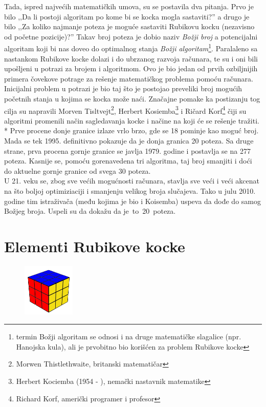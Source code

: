 \documentclass[a4paper]{article}
\begin{document}
Tada, ispred najvećih matematičkih umova, su se postavila dva pitanja. Prvo je bilo ,,Da li postoji algoritam po kome bi se kocka mogla sastaviti?'' a drugo je bilo ,,Za koliko najmanje poteza je moguće sastaviti Rubikovu kocku (nezavisno od početne pozicije)?'' Takav broj poteza je dobio naziv \textit{Božji broj} a potencijalni algoritam koji bi nas doveo do optimalnog stanja \textit{Božji algoritam}\footnote{termin Božji algoritam se odnosi i na druge matematičke slagalice (npr. Hanojska kula), ali je prvobitno bio korišćen za problem Rubikove kocke}. Paralaleno sa nastankom Rubikove kocke dolazi i do ubrzanog razvoja računara, te su i oni bili upošljeni u potrazi za brojem i algoritmom. Ovo je bio jedan od prvih ozbiljnijih primera čovekove potrage za rešenje matematičkog problema pomoću računara. \\

Inicijalni problem u potrazi je bio taj što je postojao preveliki broj mogućih početnih stanja u kojima se kocka može naći. Značajne pomake ka postizanju tog cilja su napravili Morven Tisltvejt\footnote{{Morwen Thistlethwaite}, britanski matematičar}, Herbert Kosiemba\footnote{{Herbert Kociemba} (1954 - ), nemački nastavnik matematike} i Ričard Korf\footnote{{Richard Korf}, američki programer i profesor} čiji su algoritmi promenili način sagledavanja kocke i načine na koji će se rešenje tražiti.\\*
Prve procene donje granice izlaze vrlo brzo, gde se 18 pominje kao moguć broj. Mada se tek 1995. definitivno pokazuje da je donja granica 20 poteza. Sa druge strane, prva procena gornje granice se javlja 1979. godine i postavlja se na 277 poteza. Kasnije se, pomoću gorenavedena tri algoritma, taj broj smanjiti i doći do aktuelne gornje granice od svega 30 poteza.  \\

U 21. veku se, zbog sve većih mogućnosti računara, stavlja sve veći i veći akcenat na što boljoj optimiziaciji i smanjenju velikog broja slučajeva. Tako u julu 2010. godine tim istraživača (među kojima je bio i Koisemba) uspeva da dođe do samog Božjeg broja. Uspeli su da dokažu da je to 20 poteza.

\section{Elementi Rubikove kocke}
\label{sec:elementi}

    \begin{figure}
         \centering
         \includegraphics[width=2.5cm]{images/slozena-kocka.png} 
         \caption{}
         \label{fig:kocka}
    \end{figure}
\end{document}
